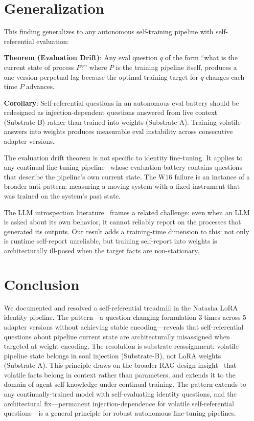 \documentclass{article}
\begin{document}
\section{Generalization}

This finding generalizes to any autonomous self-training pipeline with self-referential evaluation:

\textbf{Theorem (Evaluation Drift)}: Any eval question $q$ of the form ``what is the current state of process $P$?'' where $P$ is the training pipeline itself, produces a one-version perpetual lag because the optimal training target for $q$ changes each time $P$ advances.

\textbf{Corollary}: Self-referential questions in an autonomous eval battery should be redesigned as injection-dependent questions answered from live context (Substrate-B) rather than trained into weights (Substrate-A). Training volatile answers into weights produces measurable eval instability across consecutive adapter versions.

The evaluation drift theorem is not specific to identity fine-tuning. It applies to any continual fine-tuning pipeline~\cite{luo2023empirical,ren2026selfimproving} whose evaluation battery contains questions that describe the pipeline's own current state. The W16 failure is an instance of a broader anti-pattern: measuring a moving system with a fixed instrument that was trained on the system's past state.

The LLM introspection literature~\cite{naphade2026introspection} frames a related challenge: even when an LLM is asked about its own behavior, it cannot reliably report on the processes that generated its outputs. Our result adds a training-time dimension to this: not only is runtime self-report unreliable, but training self-report into weights is architecturally ill-posed when the target facts are non-stationary.

\section{Conclusion}
We documented and resolved a self-referential treadmill in the Natasha LoRA~\cite{hu2022lora} identity pipeline. The pattern---a question changing formulation 3 times across 5 adapter versions without achieving stable encoding---reveals that self-referential questions about pipeline current state are architecturally misassigned when targeted at weight encoding. The resolution is substrate reassignment: volatile pipeline state belongs in soul injection (Substrate-B), not LoRA weights (Substrate-A). This principle draws on the broader RAG design insight~\cite{lewis2020rag} that volatile facts belong in context rather than parameters, and extends it to the domain of agent self-knowledge under continual training. The pattern extends to any continually-trained model with self-evaluating identity questions, and the architectural fix---permanent injection-dependence for volatile self-referential questions---is a general principle for robust autonomous fine-tuning pipelines.
\end{document}
